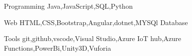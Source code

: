 
\begin{cvskills}

  \cvskill
    {Programming} %
    {Java,JavaScript,SQL,Python} %

  \cvskill
    {Web} %
    {HTML,CSS,Bootstrap,Angular,dotnet,MYSQl Database} %

  \cvskill
    {Tools} %
    {git,github,vscode,Visual Studio,Azure IoT hub,Azure Functions,PowerBi,Unity3D,Vuforia} %

\end{cvskills}
